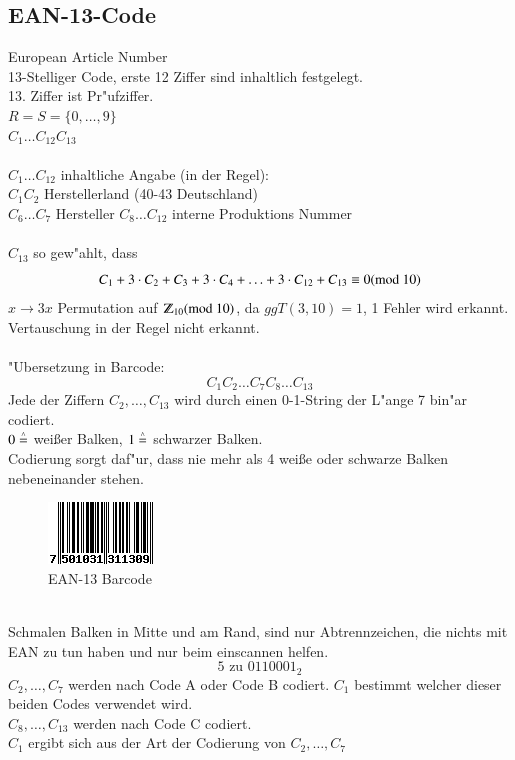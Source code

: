 \subsection{EAN-13-Code}
European Article Number\\
13-Stelliger Code, erste 12 Ziffer sind inhaltlich festgelegt.\\
13. Ziffer ist Pr"ufziffer.\\
$R=S=\{ 0, \ldots, 9\}$ \\
$C_1 \ldots C_{12} C_{13}$\\
\\
$C_1 \ldots C_{12}$ inhaltliche Angabe (in der Regel):\\
$C_1 C_2$ Herstellerland (40-43 Deutschland)\\
$C_6 \ldots C_7$ Hersteller
$C_8 \ldots C_{12}$ interne Produktions Nummer\\
\\
$C_{13}$ so gew"ahlt, dass
\[
	C_1 + 3\cdot C_2 + C_3 + 3\cdot C_4 + \ldots + 3\cdot C_{12} + C_{13} \equiv 0 (\text{mod }10)
\]
$x \rightarrow 3x$ Permutation auf $\Z_{10} (\md{10})$, da $ggT(3,10)=1$, %
1 Fehler wird erkannt. Vertauschung in der Regel nicht erkannt. \\
\\
"Ubersetzung in Barcode:
\[	
	C_1 C_2 \ldots C_7 C_8 \ldots C_{13}
\]
Jede der Ziffern $C_2, \ldots, C_{13}$ wird durch einen 0-1-String der L"ange 7 bin"ar codiert. \\
$0 \stackrel{\scriptscriptstyle\wedge}{=}$ wei\ss er Balken, $1 \stackrel{\scriptscriptstyle\wedge}{=}$ schwarzer Balken. \\
Codierung sorgt daf"ur, dass nie mehr als 4 wei\ss e oder schwarze Balken nebeneinander stehen. \\
\begin{figure}[h]
	\centering
	\includegraphics{./img/ean13.png}
	\caption{EAN-13 Barcode}
	\label{img:EAN-13 Barcode}
\end{figure}
\\
Schmalen Balken in Mitte und am Rand, sind nur Abtrennzeichen, die nichts mit EAN zu tun haben und nur beim einscannen helfen.\\
\[
	5 \text{ zu }0110001_2
\]
$C_2,\ldots, C_7$ werden nach Code A oder Code B codiert. $C_1$ bestimmt welcher dieser beiden Codes verwendet wird. \\
$C_8,\ldots, C_{13}$ werden nach Code C codiert.\\
$C_1$ ergibt sich aus der Art der Codierung von $C_2,\ldots,C_7$

